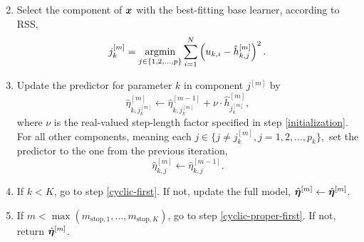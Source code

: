 \begin{algorithm}
\begin{enumerate}
\begin{equation*}
        \end{equation*}
    \item
        Select the component of $\bm{x}$ with the best-fitting base learner, according to RSS,
        \begin{equation*}
            j_k^{[m]}=\operatorname*{argmin}_{j\in\{1,2,\ldots,p\}}\sum_{i=1}^N \left(u_{k,i}-\hat{h}_{k,j}^{[m]}\right)^2.
        \end{equation*}
    \item
        Update the predictor for parameter $k$ in component $j^{[m]}$ by
        \begin{equation*}
            \hat{\eta}_{k,j_k^{[m]}}^{[m]}\gets\hat{\eta}_{k,j_k^{[m]}}^{[m-1]}+\nu\cdot\hat{h}_{j_k^{[m]}}^{[m]},
        \end{equation*}
        where $\nu$ is the real-valued step-length factor specified in step \ref{initialization}. For all other components,
        meaning each $j\in\{j\neq j_k^{[m]},j=1,2,\ldots,p_k\},$ set the predictor to the one from the previous iteration,
        \begin{equation*}
            \hat{\eta}_{k,j}^{[m]}\gets\hat{\eta}_{k,j}^{[m-1]}.
        \end{equation*}
    \item
        \label{cyclic-last}
        If $k<K$, go to step \ref{cyclic-first}. If not, update the full model, $\hat{\boldsymbol{\eta}}^{[m]}\gets\hat{\boldsymbol{\eta}}^{[m]}$.
    \item
        If $m<\max(m_{\text{stop},1},\ldots,m_{\text{stop},K})$, go to step \ref{cyclic-proper-first}.
        If not, return $\hat{\boldsymbol{\eta}}^{[m]}$.
\end{enumerate}
\end{algorithm}

